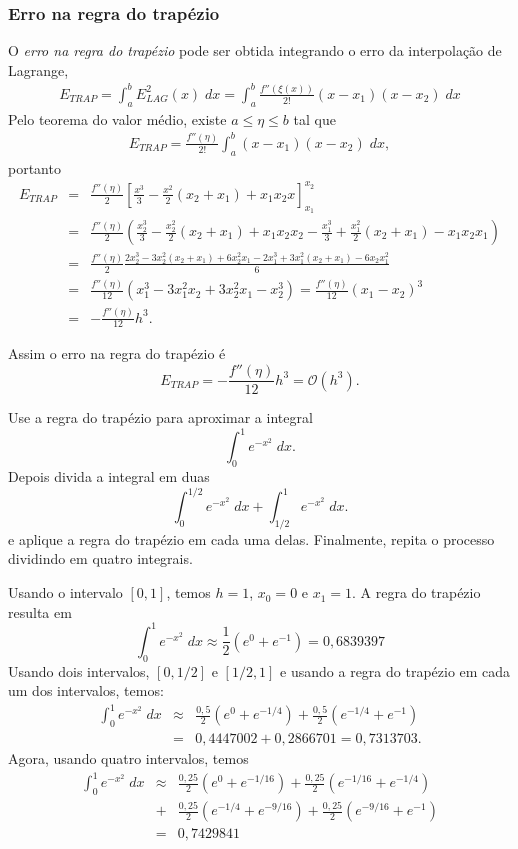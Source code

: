 \subsubsection{Erro na regra do trapézio}
O \textit{erro na regra do trapézio} pode ser obtida integrando o erro da interpolação de Lagrange,
\begin{eqnarray*}
   E_{TRAP} = \int_a^b E^2_{LAG}(x) \;dx= \int_a^b \frac{f''(\xi(x))}{2!}(x-x_1)(x-x_2) \;dx
\end{eqnarray*}
Pelo teorema do valor médio, existe $a\leq \eta\leq b$ tal que
\begin{eqnarray*}
    E_{TRAP} = \frac{f''(\eta)}{2!}\int_a^b (x-x_1)(x-x_2) \;dx,
\end{eqnarray*}
portanto
\begin{eqnarray*}
     E_{TRAP}
  &=& \frac{f''(\eta)}{2}\left[\frac{x^3}{3}-\frac{x^2}{2}(x_2+x_1)+x_1x_2x\right]_{x_1}^{x_2}\\
  &=& \frac{f''(\eta)}{2}\left(\frac{x_2^3}{3}-\frac{x_2^2}{2}(x_2+x_1)+x_1x_2x_2-\frac{x_1^3}{3}+\frac{x_1^2}{2}(x_2+x_1)-x_1x_2x_1\right)\\
  &=& \frac{f''(\eta)}{2}\frac{2x_2^3-3x_2^2(x_2+x_1)+6x_2^2x_1-2x_1^3+3x_1^2(x_2+x_1)-6x_2x_1^2}{6}\\
  &=& \frac{f''(\eta)}{12}\left(x_1^3-3x_1^2x_2+3x_2^2x_1-x_2^3\right) 
   =  \frac{f''(\eta)}{12}(x_1-x_2)^3\\
  &=& -\frac{f''(\eta)}{12}h^3.
\end{eqnarray*}

Assim o erro na regra do trapézio é 
$$
E_{TRAP}  = -\frac{f''(\eta)}{12}h^3 = \mathcal{O}(h^3).
$$

\begin{ex}
Use a regra do trapézio para aproximar a integral
$$
\int_0^1e^{-x^2}\;dx.
$$
Depois divida a integral em duas
$$
\int_0^{1/2}e^{-x^2}\;dx+\int_{1/2}^{1}e^{-x^2}\;dx.
$$
e aplique a regra do trapézio em cada uma delas. Finalmente, repita o processo dividindo em quatro integrais.
\end{ex}
Usando o intervalo $[0,1]$, temos $h=1$, $x_0=0$ e $x_1=1$. A regra do trapézio resulta em
$$
\int_0^1e^{-x^2}\;dx\approx \frac{1}{2}(e^{0}+e^{-1})=0,6839397
$$
Usando dois intervalos, $[0,1/2]$ e $[1/2,1]$ e usando a regra do trapézio em cada um dos intervalos, temos:
\begin{eqnarray*}
\int_0^1e^{-x^2}\;dx &\approx& \frac{0,5}{2}\left(e^{0}+e^{-1/4}\right) + \frac{0,5}{2}\left(e^{-1/4}+e^{-1}\right) \\
&=& 0,4447002+0,2866701 =0,7313703.
\end{eqnarray*}
Agora, usando quatro intervalos, temos
\begin{eqnarray*}
\int_0^1e^{-x^2}\;dx &\approx& \frac{0,25}{2}\left(e^{0}+e^{-1/16}\right) + \frac{0,25}{2}\left(e^{-1/16}+e^{-1/4}\right) \\
&+& \frac{0,25}{2}\left(e^{-1/4}+e^{-9/16}\right)+\frac{0,25}{2}\left(e^{-9/16}+e^{-1}\right) \\
&=& 0,7429841
\end{eqnarray*}



